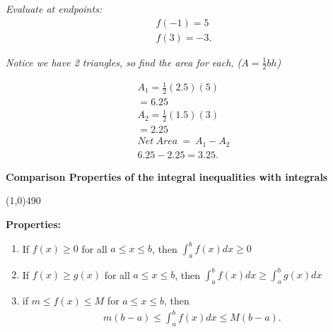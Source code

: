 \documentclass{report}
\begin{document}
\bigbreak \noindent 
\textit{Evaluate at endpoints:}
\begin{align*}
  f(-1) = 5 \\
  f(3) = -3
.\end{align*}
%

\begin{figure}[ht]
  \centering
  \label{fig:figure11}
\end{figure}



\bigbreak \noindent 
\textit{Notice we have 2 triangles, so find the area for each, ($A=\frac{1}{2}bh$)}

\begin{align*}
  A_{1} = \frac{1}{2}(2.5)(5) \\
  = 6.25 \\
  A_{2} = \frac{1}{2}(1.5)(3) \\ 
  = 2.25 \\
  Net\ Area\ =\ A_{1} - A_{2} \\
  \boxed{6.25 - 2.25 = 3.25}
.\end{align*}

\bigbreak \noindent 
{}

\pagebreak \bigbreak \noindent
\begin{mdframed}
  \begin{large}
    \begin{center}
      \textbf{Comparison Properties of the integral inequalities with integrals}
    \end{center}
  \end{large}
\end{mdframed}
\line(1,0){490}
\bigbreak \noindent \bigbreak
\begin{mdframed}
  \textbf{Properties:}
  \begin{enumerate}
    \item If $f(x) \geq 0$ for all $a \leq x \leq b  $, then $\int_{a}^{b}f(x)dx \geq 0$
    \item If $f(x) \geq g(x)$ for all $a \leq x \leq b $, then $\int_{a}^{b}f(x)dx \geq \int_{a}^{b}g(x)dx$
    \item if $m \leq f(x) \leq M$ for $a \leq x \leq b$, then
      \begin{align*}
        m(b-a) \leq \int_{a}^{b}f(x)dx \leq M(b-a)
      .\end{align*}
  \end{enumerate}
\end{mdframed}
\end{document}
